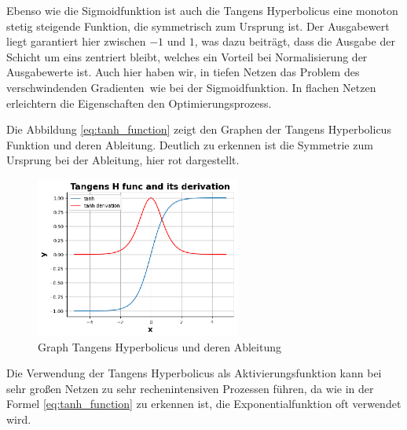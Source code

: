 Ebenso wie die Sigmoidfunktion ist auch die Tangens Hyperbolicus eine monoton stetig steigende Funktion, die symmetrisch zum Ursprung ist. Der Ausgabewert liegt garantiert hier zwischen $-1$ und $1$, was dazu beiträgt, dass die Ausgabe der Schicht um eins zentriert bleibt, welches ein Vorteil bei Normalisierung der Ausgabewerte ist. Auch hier haben wir, in tiefen Netzen das \glqq Problem des verschwindenden Gradienten\grqq \ wie bei der Sigmoidfunktion. In flachen Netzen erleichtern die Eigenschaften den Optimierungsprozess.\vspace{0.2cm}



Die Abbildung \ref{eq:tanh_function} zeigt den Graphen der Tangens Hyperbolicus Funktion und deren Ableitung. Deutlich zu erkennen ist die Symmetrie zum Ursprung bei der Ableitung, hier rot dargestellt.

\begin{figure}[!ht]
	\includegraphics[width=0.6\textwidth]{content/chapter_basics/plots/tanh_func_plot.eps}
	\centering
	\caption{Graph Tangens Hyperbolicus und deren Ableitung}
	\label{img:tanh_func_graph}
\end{figure}

Die Verwendung der Tangens Hyperbolicus als Aktivierungsfunktion kann bei sehr großen Netzen zu sehr rechenintensiven Prozessen führen, da wie in der Formel \ref{eq:tanh_function} zu erkennen ist, die Exponentialfunktion oft verwendet wird.\vspace{0.2cm}

